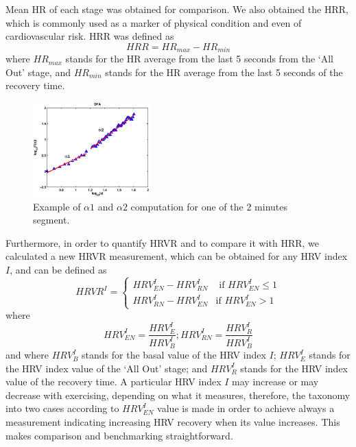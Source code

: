 Mean HR of each stage was obtained for comparison.
We also obtained the HRR, which is commonly used as a marker of physical condition and even of cardiovascular risk. HRR was defined as
\[HRR = HR_{max} - HR_{min}\]
where $HR_{max}$ stands for the HR average from the last 5 seconds from the `All Out' stage, and $HR_{min}$ stands for the HR average from the last 5 seconds of the recovery time.


\begin{figure}[t]
\centering
\includegraphics[width=0.4\textwidth]{./figs/alphas.eps}
\caption{Example of $\alpha1$ and $\alpha2$ computation for one of the 2 minutes segment.}
\label{fig:alphas}
\end{figure} 


Furthermore, in order to quantify HRVR and to compare it with HRR, we calculated a new  HRVR measurement, which can be obtained for any HRV index $I$, and can be defined as
\[HRVR^I = \left\{ \begin{array}{rl}
 HRV^I_{EN}- HRV^I_{RN} &\mbox{ if $HRV^I_{EN} \leq 1$} \\ 
 HRV^I_{RN}- HRV^I_{EN} &\mbox{if $HRV^I_{EN} > 1$}
       \end{array} \right.\]
where
\[HRV^I_{EN} = \frac{HRV^I_E}{HRV^I_B};  HRV^I_{RN} = \frac{HRV^I_R}{HRV^I_B}\]
and where $HRV^I_B$ stands for the basal value of the HRV index $I$; $HRV^I_E$ stands for the HRV index value of the `All Out' stage; and $HRV^I_R$ stands for the HRV index value of the recovery time. A particular HRV index $I$ may increase or may decrease with exercising, depending on what it measures, therefore, the taxonomy into two cases according to $HRV^I_{EN}$ value is made in order to achieve always a measurement indicating increasing HRV recovery when its value increases.  This makes comparison and benchmarking straightforward.
